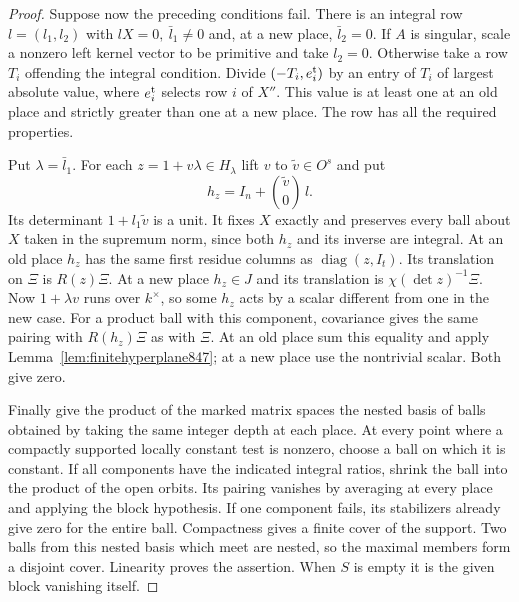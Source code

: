 \documentclass[a4paper,11pt]{article}
\theoremstyle{definition}
\theoremstyle{remark}
\numberwithin{equation}{section}
\begin{document}
\begin{proof}
Suppose now the preceding conditions fail. There is an integral
row \(l=(l_1,l_2)\) with \(lX=0,\ \bar l_1\ne0\) and, at a new
place, \(\bar l_2=0\). If \(A\) is singular, scale a nonzero left
kernel vector to be primitive and take \(l_2=0\). Otherwise take
a row \(T_i\) offending the integral condition. Divide
\((-T_i,e_i^{\rm t})\) by an entry of \(T_i\) of largest absolute
value, where \(e_i^{\rm t}\) selects row \(i\) of \(X''\).
This value is at least one at an old place and strictly greater
than one at a new place. The row has all the required properties.

Put \(\lambda=\bar l_1\). For each \(z=1+v\lambda\in H_\lambda\)
lift \(v\) to \(\tilde v\in O^s\) and put
\[
           h_z=I_n+\binom{\tilde v}{0}\,l .
\]
Its determinant \(1+l_1\tilde v\) is a unit. It fixes \(X\)
exactly and preserves every ball about \(X\) taken in the
supremum norm, since both \(h_z\) and its inverse are integral.
At an old place \(h_z\) has the same first residue columns as
\(\operatorname{diag}(z,I_t)\). Its translation on \(\Xi\)
is \(R(z)\Xi\). At a new place \(h_z\in J\) and its translation
is \(\chi(\det z)^{-1}\Xi\). Now \(1+\lambda v\) runs over
\(k^\times\), so some \(h_z\) acts by a scalar different from
one in the new case. For a product ball with this component,
covariance gives the same pairing with \(R(h_z)\Xi\) as with
\(\Xi\). At an old place sum this equality and apply
Lemma~\ref{lem:finitehyperplane847}; at a new place use the
nontrivial scalar. Both give zero.

Finally give the product of the marked matrix spaces the nested
basis of balls obtained by taking the same integer depth at
each place. At every point where a compactly supported locally
constant test is nonzero, choose a ball on which it is constant.
If all components have the indicated integral ratios, shrink
the ball into the product of the open orbits. Its pairing
vanishes by averaging at every place and applying the block
hypothesis. If one component fails, its stabilizers already
give zero for the entire ball. Compactness gives a finite
cover of the support. Two balls from this nested basis which
meet are nested, so the maximal members form a disjoint cover.
Linearity proves the assertion. When \(S\) is empty it is the
given block vanishing itself.
\end{proof}
\clearpage
\end{document}
